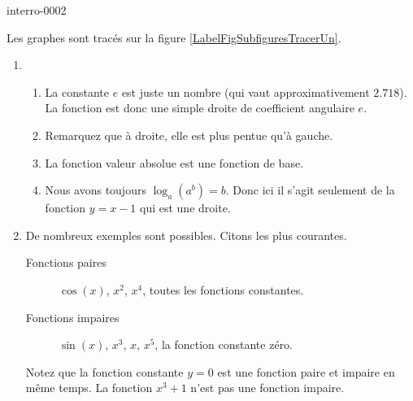 
\begin{corrige}{interro-0002}

\newcommand{\CaptionFigSubfiguresTracerUn}{Les fonctions de la question \ref{exointerro-0002}.}


Les graphes sont tracés sur la figure \ref{LabelFigSubfiguresTracerUn}.

\begin{enumerate}
	\item
		\begin{enumerate}
			\item
				La constante $e$ est juste un nombre (qui vaut approximativement $2.718$). La fonction est donc une simple droite de coefficient angulaire $e$.
			\item
				Remarquez que à droite, elle est plus pentue qu'à gauche.
			\item
				La fonction valeur absolue est une fonction de base.
			\item
				Nous avons toujours $\log_a(a^b)=b$. Donc ici il s'agit seulement de la fonction $y=x-1$ qui est une droite.
		\end{enumerate}
	\item
		De nombreux exemples sont possibles. Citons les plus courantes.
		\begin{description}
			\item[Fonctions paires] $\cos(x)$, $x^2$, $x^4$, toutes les fonctions constantes.
			\item[Fonctions impaires] $\sin(x)$, $x^3$, $x$, $x^5$, la fonction constante zéro.
		\end{description}
		Notez que la fonction constante $y=0$ est une fonction paire et impaire en même temps. La fonction $x^3+1$ n'est pas une fonction impaire.

\end{enumerate}


\end{corrige}
